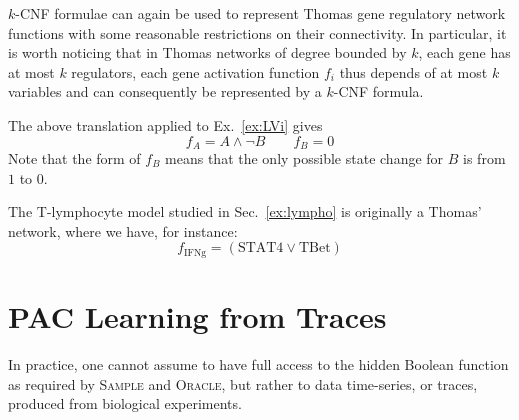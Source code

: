 \documentclass{llncs}
\newif\ifcomments%
\newcommand{\francois}[1]{\ifcomments\textcolor{blue}{#1}\fi}
\begin{document}
$k$-CNF formulae can again be used to represent Thomas gene regulatory network functions with some reasonable restrictions on their connectivity.
In particular, it is worth noticing that in Thomas networks of degree bounded by $k$,
each gene has at most $k$ regulators, each gene activation function $f_i$ thus depends of at most $k$ variables
and can consequently be represented by a $k$-CNF formula.

\begin{example}
   The above translation applied to
   Ex.~\ref{ex:LVi} gives
   \[f_A = A \wedge\neg B\qquad f_B = 0\]
   Note that the form of $f_B$ means that the only possible state change
   for $B$ is from $1$ to $0$. 
\end{example}

\begin{example}
   The T-lymphocyte model studied in Sec.~\ref{ex:lympho} is originally a Thomas' network, where we have, for
   instance:
   \[f_\text{IFNg}=(\text{STAT4}\vee \text{TBet})\]
\end{example}

\section{PAC Learning from Traces} %

\francois{Les anciennes sections 4.1 et 4.2 (4.3-4.4) sont a reecrire completement dans les nouvelles section 4.1 et 4.2. Le discours doit etre scientifique sur les traces de simulation que nous considerons sans tirer de conclusions prematurees sur les traces ``reelles'' ``en pratique'' que nous ne considerons pas.}

In practice, one cannot assume to have full access to the hidden Boolean function as required by
\textsc{Sample} and \textsc{Oracle}, but rather to data time-series, or traces,
produced from biological experiments. 
\end{document}
